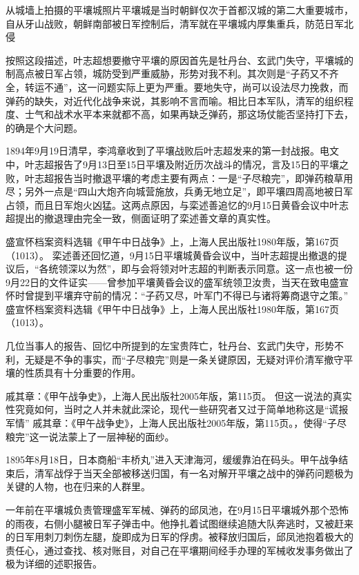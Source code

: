 \documentclass[12pt,UTF8]{ctexbook}
\begin{document}
从城墙上拍摄的平壤城照片平壤城是当时朝鲜仅次于首都汉城的第二大重要城市，自从牙山战败，朝鲜南部被日军控制后，清军就在平壤城内厚集重兵，防范日军北侵

按照这段描述，叶志超想要撤守平壤的原因首先是牡丹台、玄武门失守，平壤城的制高点被日军占领，城防受到严重威胁，形势对我不利。其次则是“子药又不齐全，转运不通”，这一问题实际上更为严重。要地失守，尚可以设法尽力挽救，而弹药的缺失，对近代化战争来说，其影响不言而喻。相比日本军队，清军的组织程度、士气和战术水平本来就都不高，如果再缺乏弹药，那这场仗能否坚持打下去，的确是个大问题。

1894年9月19日清早，李鸿章收到了平壤战败后叶志超发来的第一封战报。电文中，叶志超报告了9月13日至15日平壤及附近历次战斗的情况，言及15日的平壤之败，叶志超报告当时撤退平壤的考虑主要有两点：一是“子尽粮完”，即弹药粮草用尽；另外一点是“四山大炮齐向城营施放，兵勇无地立足”，即平壤四周高地被日军占领，而且日军炮火凶猛。这两点原因，与栾述善追忆的9月15日黄昏会议中叶志超提出的撤退理由完全一致，侧面证明了栾述善文章的真实性。

盛宣怀档案资料选辑《甲午中日战争》上，上海人民出版社1980年版，第167页（1013）。
栾述善还回忆道，9月15日平壤城黄昏会议中，当叶志超提出撤退的提议后，“各统领深以为然”，即与会将领对叶志超的判断表示同意。这一点也被一份9月22日的文件证实——曾参加平壤黄昏会议的盛军统领卫汝贵，当天在致电盛宣怀时曾提到平壤弃守前的情况：“子药又尽，叶军门不得已与诸将筹商退守之策。” 盛宣怀档案资料选辑《甲午中日战争》上，上海人民出版社1980年版，第167页（1013）。

几位当事人的报告、回忆中所提到的左宝贵阵亡，牡丹台、玄武门失守，形势不利，无疑是不争的事实，而“子尽粮完”则是一条关键原因，无疑对评价清军撤守平壤的性质具有十分重要的作用。

戚其章：《甲午战争史》，上海人民出版社2005年版，第115页。
但这一说法的真实性究竟如何，当时之人并未就此深论，现代一些研究者又过于简单地称这是“谎报军情” 戚其章：《甲午战争史》，上海人民出版社2005年版，第115页。，使得“子尽粮完”这一说法蒙上了一层神秘的面纱。

1895年8月18日，日本商船“丰桥丸”进入天津海河，缓缓靠泊在码头。甲午战争结束后，清军战俘于当天全部被移送归国，有一名对解开平壤之战中的弹药问题极为关键的人物，也在归来的人群里。

一年前在平壤城负责管理盛军军械、弹药的邱凤池，在9月15日平壤城外那个恐怖的雨夜，右侧小腿被日军子弹击中。他挣扎着试图继续追随大队奔逃时，又被赶来的日军用刺刀刺伤左腿，旋即成为日军的俘虏。被释放归国后，邱凤池抱着极大的责任心，通过查找、核对账目，对自己在平壤期间经手办理的军械收发事务做出了极为详细的述职报告。
\end{document}
